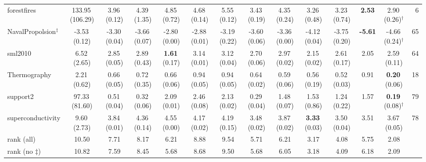 \begin{tabular}{@{}lccccccccccc>{\columncolor{agent}}cr@{}}
forestfires & 133.95\,{\scriptsize(106.29)} & 3.96\,{\scriptsize(0.12)} & 4.39\,{\scriptsize(1.35)} & 4.85\,{\scriptsize(0.72)} & 4.68\,{\scriptsize(0.14)} & 5.55\,{\scriptsize(0.12)} & 3.43\,{\scriptsize(0.19)} & 4.35\,{\scriptsize(0.24)} & 3.26\,{\scriptsize(0.48)} & 3.23\,{\scriptsize(0.74)} & \textbf{2.53} & 2.90\,{\scriptsize(0.26)}$^\dagger$ & 6 \\
NavalPropolsion$^\ddagger$ & -3.53\,{\scriptsize(0.12)} & -3.30\,{\scriptsize(0.04)} & -3.66\,{\scriptsize(0.07)} & -2.80\,{\scriptsize(0.00)} & -2.88\,{\scriptsize(0.01)} & -3.19\,{\scriptsize(0.22)} & -3.60\,{\scriptsize(0.06)} & -3.36\,{\scriptsize(0.00)} & -4.12\,{\scriptsize(0.04)} & -3.75\,{\scriptsize(0.20)} & \textbf{-5.61} & -4.66\,{\scriptsize(0.24)}$^\dagger$ & 65 \\
sml2010 & 6.52\,{\scriptsize(2.65)} & 2.85\,{\scriptsize(0.05)} & 2.89\,{\scriptsize(0.43)} & \textbf{1.61}\,{\scriptsize(0.17)} & 3.14\,{\scriptsize(0.01)} & 3.12\,{\scriptsize(0.04)} & 2.70\,{\scriptsize(0.06)} & 2.97\,{\scriptsize(0.02)} & 2.15\,{\scriptsize(0.02)} & 2.61\,{\scriptsize(0.17)} & 2.05 & 2.59\,{\scriptsize(0.11)} & 64 \\
Thermography & 2.21\,{\scriptsize(0.62)} & 0.66\,{\scriptsize(0.05)} & 0.72\,{\scriptsize(0.35)} & 0.66\,{\scriptsize(0.06)} & 0.94\,{\scriptsize(0.05)} & 0.94\,{\scriptsize(0.05)} & 0.64\,{\scriptsize(0.02)} & 0.59\,{\scriptsize(0.06)} & 0.56\,{\scriptsize(0.19)} & 0.52\,{\scriptsize(0.03)} & 0.91 & \textbf{0.20}\,{\scriptsize(0.06)} & 18 \\
support2 & 97.33\,{\scriptsize(81.60)} & 0.51\,{\scriptsize(0.04)} & 0.32\,{\scriptsize(0.06)} & 2.09\,{\scriptsize(0.01)} & 2.46\,{\scriptsize(0.08)} & 2.13\,{\scriptsize(0.02)} & 0.29\,{\scriptsize(0.04)} & 1.48\,{\scriptsize(0.07)} & 1.53\,{\scriptsize(0.86)} & 1.24\,{\scriptsize(0.22)} & 1.57 & \textbf{0.19}\,{\scriptsize(0.08)}$^\dagger$ & 79 \\
superconductivity & 9.60\,{\scriptsize(2.73)} & 3.84\,{\scriptsize(0.01)} & 4.36\,{\scriptsize(0.14)} & 4.55\,{\scriptsize(0.00)} & 4.17\,{\scriptsize(0.02)} & 4.19\,{\scriptsize(0.15)} & 3.48\,{\scriptsize(0.02)} & 3.87\,{\scriptsize(0.02)} & \textbf{3.33}\,{\scriptsize(0.03)} & 3.50\,{\scriptsize(0.04)} & 3.51 & 3.67\,{\scriptsize(0.05)} & 78 \\
\midrule
rank (all) & 10.50 & 7.71 & 8.17 & 6.21 & 8.88 & 9.54 & 5.71 & 6.21 & 3.17 & 4.08 & 5.75 & 2.08 &  \\
rank (no $\ddagger$) & 10.82 & 7.59 & 8.45 & 5.68 & 8.68 & 9.50 & 5.68 & 6.05 & 3.18 & 4.09 & 6.18 & 2.09 &  \\
\bottomrule
\end{tabular}
